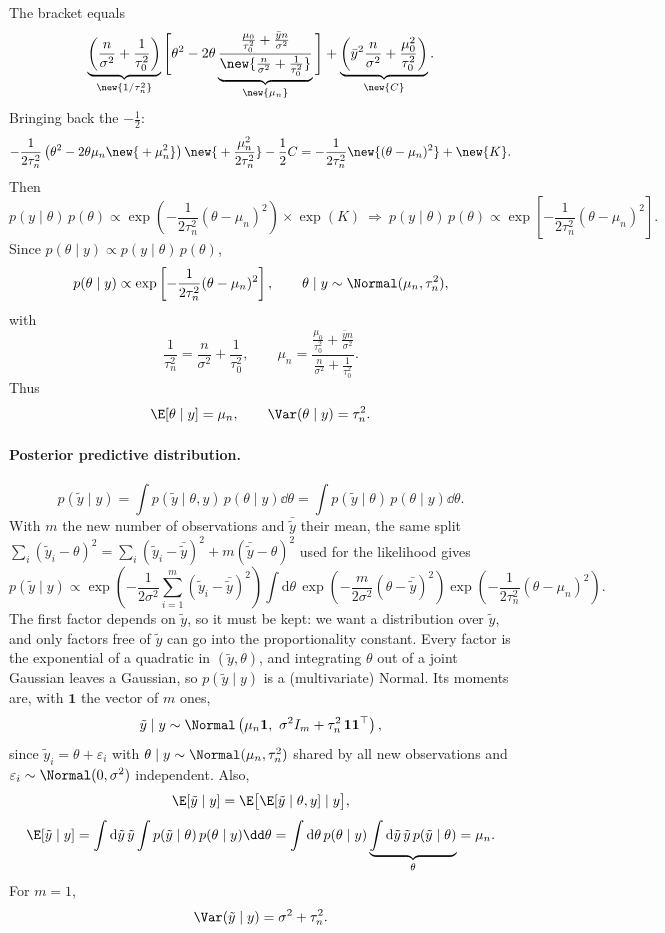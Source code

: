 The bracket equals
\[
\underbrace{\left(\frac{n}{\sigma^2} + \frac{1}{\tau_0^2}\right)}_{\new{1/\tau_n^2}}
\Bigg[\theta^2 - 2\theta\underbrace{\frac{\frac{\mu_0}{\tau_0^2} + \frac{\bar y n}{\sigma^2}}{\new{\frac{n}{\sigma^2} + \frac{1}{\tau_0^2}}}}_{\new{\mu_n}}\Bigg]
+ \underbrace{\left(\bar y^2\frac{n}{\sigma^2} + \frac{\mu_0^2}{\tau_0^2}\right)}_{\new{C}}.
\]
Bringing back the $-\frac12$:
\[
-\frac{1}{2\tau_n^2}\left(\theta^2 - 2\theta\mu_n \new{{}+ \mu_n^2}\right) \new{{}+ \frac{\mu_n^2}{2\tau_n^2}} - \frac12 C
= -\frac{1}{2\tau_n^2}\new{(\theta - \mu_n)^2} + \new{K}.
\]
Then
\[
p(y \mid \theta)\,p(\theta) \propto \exp\left(-\frac{1}{2\tau_n^2}(\theta - \mu_n)^2\right)\times\exp(K)
\ \Rightarrow\
p(y \mid \theta)\,p(\theta) \propto \exp\left[-\frac{1}{2\tau_n^2}(\theta - \mu_n)^2\right].
\]
Since $p(\theta \mid y) \propto p(y \mid \theta)\,p(\theta)$,
\[
p(\theta \mid y) \propto \exp\left[-\frac{1}{2\tau_n^2}(\theta - \mu_n)^2\right],
\qquad
\theta \mid y \sim \Normal(\mu_n, \tau_n^2),
\]
with
\[
\frac{1}{\tau_n^2} = \frac{n}{\sigma^2} + \frac{1}{\tau_0^2},
\qquad
\mu_n = \frac{\frac{\mu_0}{\tau_0^2} + \frac{\bar y n}{\sigma^2}}{\frac{n}{\sigma^2} + \frac{1}{\tau_0^2}}.
\]
Thus
\[
\E[\theta \mid y] = \mu_n, \qquad \Var(\theta \mid y) = \tau_n^2.
\]

\paragraph{Posterior predictive distribution.}
\[
p(\tilde y \mid y) = \int p(\tilde y \mid \theta, y)\,p(\theta \mid y)\dd\theta = \int p(\tilde y \mid \theta)\,p(\theta \mid y)\dd\theta.
\]
With $m$ the new number of observations and $\bar{\tilde y}$ their mean, the same split $\sum_i(\tilde y_i - \theta)^2 = \sum_i(\tilde y_i - \bar{\tilde y})^2 + m(\bar{\tilde y} - \theta)^2$ used for the likelihood gives
\[
p(\tilde y \mid y) \propto \exp\left(-\frac{1}{2\sigma^2}\sum_{i=1}^{m}(\tilde y_i - \bar{\tilde y})^2\right)\int \mathrm{d}\theta\,\exp\left(-\frac{m}{2\sigma^2}(\theta - \bar{\tilde y})^2\right)\exp\left(-\frac{1}{2\tau_n^2}(\theta - \mu_n)^2\right).
\]
The first factor depends on $\tilde y$, so it must be kept: we want a distribution over $\tilde y$, and only factors free of $\tilde y$ can go into the proportionality constant. Every factor is the exponential of a quadratic in $(\tilde y, \theta)$, and integrating $\theta$ out of a joint Gaussian leaves a Gaussian, so $p(\tilde y \mid y)$ is a (multivariate) Normal. Its moments are, with $\mathbf{1}$ the vector of $m$ ones,
\[
\tilde y \mid y \sim \Normal\left(\mu_n\mathbf{1},\ \sigma^2 I_m + \tau_n^2\,\mathbf{1}\mathbf{1}^{\top}\right),
\]
since $\tilde y_i = \theta + \varepsilon_i$ with $\theta \mid y \sim \Normal(\mu_n, \tau_n^2)$ shared by all new observations and $\varepsilon_i \sim \Normal(0, \sigma^2)$ independent. Also,
\[
\E[\tilde y \mid y] = \E\big[\E[\tilde y \mid \theta, y] \mid y\big],
\]
\[
\E[\tilde y \mid y] = \int \mathrm{d}\tilde y\,\tilde y\int p(\tilde y \mid \theta)\,p(\theta \mid y)\dd\theta
= \int \mathrm{d}\theta\,p(\theta \mid y)\underbrace{\int \mathrm{d}\tilde y\,\tilde y\,p(\tilde y \mid \theta)}_{\theta}
= \mu_n.
\]
For $m = 1$,
\[
\Var(\tilde y \mid y) = \sigma^2 + \tau_n^2.
\]

